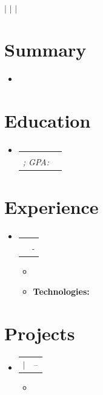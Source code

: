 \documentclass[letterpaper,11pt]{article}
\makeatletter
\newcommand{\resumeItem}[1]{
  \item\small{
    {#1 \vspace{-2pt}}
  }
}
\newcommand{\resumeSubheading}[4]{
  \vspace{-2pt}\item
    \begin{tabular*}{0.97\textwidth}[t]{l@{\extracolsep{\fill}}r}
      \textbf{#1} & #2 \\
      \textit{\small#3} & \textit{\small #4} \\
    \end{tabular*}\vspace{-7pt}
}
\newcommand{\resumeSubHeadingListStart}{\begin{itemize}[leftmargin=0.15in, label={}]}
\newcommand{\resumeSubHeadingListEnd}{\end{itemize}}
\newcommand{\resumeItemListStart}{\begin{itemize}}
\newcommand{\resumeItemListEnd}{\end{itemize}\vspace{-5pt}}
\newcommand{\technologies}[1]{
\noindent\textbf{Technologies:} #1
}
\newcommand{\resumeProjectHeading}[2]{
    \item
    \begin{tabular*}{0.97\textwidth}{l@{\extracolsep{\fill}}r}
      \small#1 & #2 \\
    \end{tabular*}\vspace{-7pt}
}
\makeatother
\begin{document}
\begin{center}
    {\LARGE \textbf{}} \\[4pt]
    \normalsize
    \href{mailto:\VAR{basic_details.email}}{} $|$
    \href{tel:\VAR{basic_details.phone}}{} $|$
    \href{\VAR{basic_details.github}}{} $|$
    \href{\VAR{basic_details.linkedin}}{}

\end{center}

\section{Summary}
\resumeSubHeadingListStart
  \item\small
    {}
\resumeSubHeadingListEnd

\section{Education}
  \resumeSubHeadingListStart
    \resumeSubheading
      { {\VAR{school.institution | latex_escape}} }{ {\VAR{school.location | latex_escape}} }
      { {\VAR{school.degree | latex_escape}}; GPA: {\VAR{school.gpa | latex_escape}} }{ {\VAR{school.year | string}} }
  \resumeSubHeadingListEnd

\section{Experience}
  \resumeSubHeadingListStart
    \resumeSubheading
      { {\VAR{job.company | latex_escape}} }{ {\VAR{job.location | latex_escape}} }
      { {\VAR{job.role | latex_escape}} }{ {\VAR{job.start | latex_escape}} - {\VAR{job.end | latex_escape}} }
      \resumeItemListStart
            \resumeItem{  }
      \resumeItem{ \technologies{} }
      \resumeItemListEnd
\resumeSubHeadingListEnd


\section{Projects}
\resumeSubHeadingListStart
{}
  \resumeProjectHeading
    {
        \BLOCK{if proj.link}\href{\VAR{proj.link}}{\textbf{\VAR{proj.name | latex_escape}}}\BLOCK{else}\textbf{\VAR{proj.name | latex_escape}}\BLOCK{endif}
        \BLOCK{if proj.technologies}
        $|$ \emph{\VAR{proj.technologies | join(', ')}}
        \BLOCK{endif}
    }
    {\VAR{proj.start | latex_escape} -- \VAR{proj.end | latex_escape}}
  \resumeItemListStart
    \resumeItem{}
  \resumeItemListEnd
{}
\resumeSubHeadingListEnd
\end{document}
